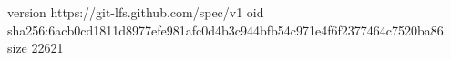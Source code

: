 version https://git-lfs.github.com/spec/v1
oid sha256:6acb0cd1811d8977efe981afc0d4b3c944bfb54c971e4f6f2377464c7520ba86
size 22621

